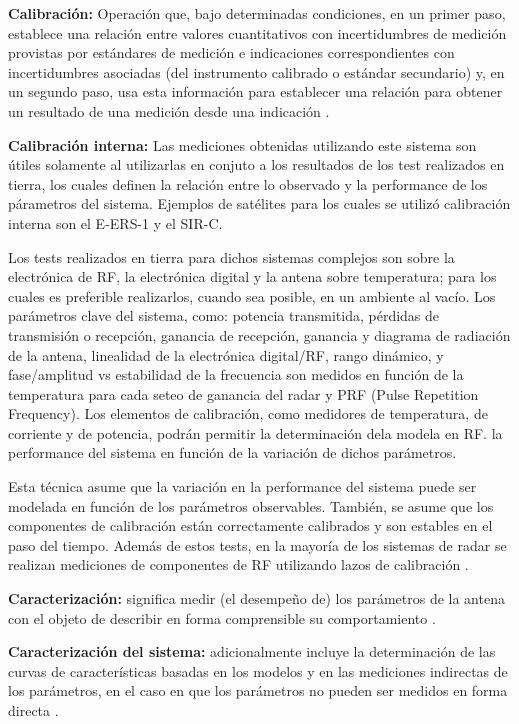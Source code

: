 {\textbf{Calibración:}} Operación que, bajo determinadas condiciones, en un primer paso, establece una relación entre 
valores cuantitativos con incertidumbres de medición provistas por estándares de medición e indicaciones correspondientes
con incertidumbres asociadas (del instrumento calibrado o estándar secundario) y, en un segundo paso, usa
esta información para establecer una relación para obtener un resultado de una medición desde una indicación \cite{CalDef}.

{\textbf{Calibración interna:}} Las mediciones obtenidas utilizando este sistema son útiles solamente al utilizarlas en 
conjuto a los resultados de los test realizados en tierra, los cuales definen la relación entre lo observado y la 
performance de los párametros del sistema. Ejemplos de satélites para los cuales se utilizó calibración interna son el 
E-ERS-1 y el SIR-C.

Los tests realizados en tierra para dichos sistemas complejos son sobre la electrónica de RF, la electrónica digital y la 
antena sobre temperatura; para los cuales es preferible realizarlos, cuando sea posible, en un ambiente al vacío. Los 
parámetros clave del sistema, como: potencia transmitida, pérdidas de transmisión o recepción, ganancia de recepción, 
ganancia y diagrama de radiación de la antena, linealidad de la electrónica digital/RF, rango dinámico, y fase/amplitud vs 
estabilidad de la frecuencia son medidos en función de la temperatura para cada seteo de ganancia del radar y PRF (Pulse 
Repetition Frequency). Los elementos de calibración, como medidores de temperatura, de corriente y de potencia, podrán 
permitir la determinación dela modela en RF. la performance del sistema en función de la variación de dichos parámetros.
    
Esta técnica asume que la variación en la performance del sistema puede ser modelada en función de los parámetros observables. 
También, se asume que los componentes de calibración están correctamente calibrados y son estables en el paso del tiempo. 
Además de estos tests, en la mayoría de los sistemas de radar se realizan mediciones de componentes de RF utilizando lazos de 
calibración \cite{Curlander1991}.

{\textbf{Caracterización:}} significa medir (el desempeño de) los parámetros de la antena con el objeto de describir en 
forma comprensible su comportamiento \cite{Mittermayer2007}.

{\textbf{Caracterización del sistema:}} adicionalmente incluye la determinación de las curvas de características basadas 
en los modelos y en las mediciones indirectas de los parámetros, en el caso en que los parámetros no pueden ser medidos 
en forma directa \cite{Mittermayer2007}.

